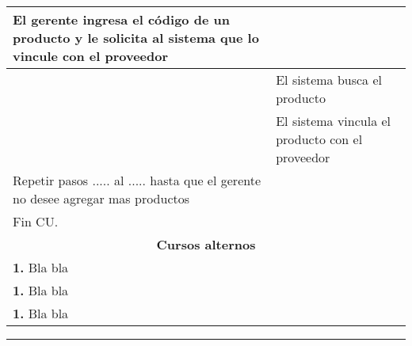 \begin{longtable}{ |p{8cm}|p{8cm}| }
			\hline
			\inc El gerente ingresa el código de un producto y le solicita al sistema que lo vincule con el proveedor  & \inc   \\
			\hline
			\inc  & El sistema busca el producto \inc   \\
			\hline
			\inc  & El sistema vincula el producto con el proveedor\inc   \\
			\inc Repetir pasos ..... al ..... hasta que el gerente no desee agregar mas productos & \inc   \\
			\inc Fin CU. & \\
		\hline
		\multicolumn{2}{|c|}{\textbf{Cursos alternos}}\\
		\hline
		\multicolumn{2}{|p{16cm}|}{\textbf{1. }Bla bla }\\
		\hline
		\multicolumn{2}{|p{16cm}|}{\textbf{1. }Bla bla }\\
		\hline
		\multicolumn{2}{|p{16cm}|}{\textbf{1. }Bla bla }\\
		\hline	
	\end{longtable}


    \setcounter{step}{0}

    \noindent\rule{169mm}{0.8mm}\\
